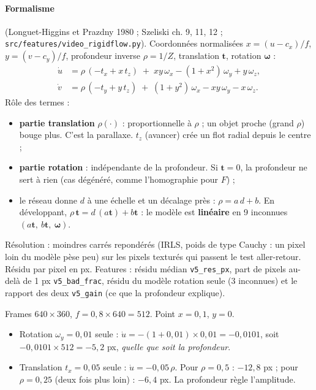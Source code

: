 \documentclass[11pt,a4paper]{article}
\begin{document}
\paragraph{Formalisme} (Longuet-Higgins et Prazdny 1980 ; Szeliski ch. 9, 11, 12 ;
\texttt{src/features/video\_rigidflow.py}). Coordonnées normalisées $x=(u-c_x)/f$, $y=(v-c_y)/f$,
profondeur inverse $\rho=1/Z$, translation $\mathbf t$, rotation $\boldsymbol\omega$ :
\[
\begin{aligned}
\dot u &= \rho\,(-t_x + x\,t_z) \;+\; x y\,\omega_x - (1+x^2)\,\omega_y + y\,\omega_z,\\
\dot v &= \rho\,(-t_y + y\,t_z) \;+\; (1+y^2)\,\omega_x - x y\,\omega_y - x\,\omega_z .
\end{aligned}
\]
Rôle des termes :
\begin{itemize}
  \item \textbf{partie translation} $\rho(\cdot)$ : proportionnelle à $\rho$ ; un objet proche (grand
        $\rho$) bouge plus. C'est la parallaxe. $t_z$ (avancer) crée un flot radial depuis le centre ;
  \item \textbf{partie rotation} : indépendante de la profondeur. Si $\mathbf t=0$, la profondeur ne
        sert à rien (cas dégénéré, comme l'homographie pour $F$) ;
  \item le réseau donne $d$ à une échelle et un décalage près : $\rho=a\,d+b$. En développant,
        $\rho\,\mathbf t = d\,(a\mathbf t) + b\mathbf t$ : le modèle est \textbf{linéaire} en 9 inconnues
        $(a\mathbf t,\ b\mathbf t,\ \boldsymbol\omega)$.
\end{itemize}
Résolution : moindres carrés repondérés (IRLS, poids de type Cauchy : un pixel loin du modèle pèse
peu) sur les pixels texturés qui passent le test aller-retour. Résidu par pixel en px. Features :
résidu médian \texttt{v5\_res\_px}, part de pixels au-delà de 1 px \texttt{v5\_bad\_frac}, résidu du
modèle rotation seule (3 inconnues) et le rapport des deux \texttt{v5\_gain} (ce que la profondeur explique).

\begin{exemple}
Frames $640\times360$, $f=0{,}8\times640=512$. Point $x=0{,}1$, $y=0$.
\begin{itemize}
  \item Rotation $\omega_y=0{,}01$ seule : $\dot u=-(1+0{,}01)\times0{,}01=-0{,}0101$, soit
        $-0{,}0101\times512=-5{,}2$ px, \emph{quelle que soit la profondeur}.
  \item Translation $t_x=0{,}05$ seule : $\dot u=-0{,}05\,\rho$. Pour $\rho=0{,}5$ : $-12{,}8$ px ; pour
        $\rho=0{,}25$ (deux fois plus loin) : $-6{,}4$ px. La profondeur règle l'amplitude.
\end{itemize}
\end{exemple}
\end{document}
